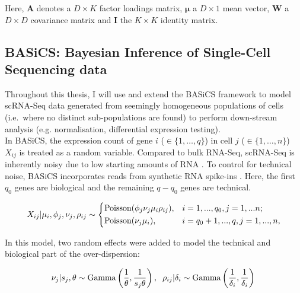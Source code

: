 Here, $\bm{A}$ denotes a $D\times{}K$ factor loadings matrix, $\bm{\mu}$ a $D\times{}1$ mean vector, $\bm{W}$ a $D\times{}D$ covariance matrix and $\bm{I}$ the $K\times{}K$ identity matrix.

\newpage

\subsection{BASiCS: Bayesian Inference of Single-Cell Sequencing data} 
\label{sec0:BASiCS}

Throughout this thesis, I will use and extend the \gls{BASiCS} framework \citep{Vallejos2015BASiCS, Vallejos2016} to model scRNA-Seq data generated from seemingly homogeneous populations of cells (i.e.~where no distinct sub-populations are found) to perform down-stream analysis (e.g. normalisation, differential expression testing).\\

In BASiCS, the expression count of gene $i$ ($ \in \{1, \ldots, q\}$) in cell $j$ ($\in \{ 1, \ldots ,n\}$) $X_{ij}$ is treated as a random variable. Compared to bulk RNA-Seq, scRNA-Seq is inherently noisy due to low starting amounts of RNA \citep{Brennecke2013}. To control for technical noise, BASiCS incorporates reads from synthetic RNA spike-ins \citep{Jiang2011}. Here, the first $q_0$ genes are biological and the  remaining $q-q_0$ genes are technical.

\begin{equation} 
 X_{ij}|\mu_i,\phi_j,\nu_j,\rho_{ij} \sim
 \left\lbrace
  \begin{aligned}
    &\textnormal{Poisson}(\phi_j\nu_j\mu_i\rho_{ij}), && i=1,...,q_0,j=1,...n;  \\ 
    &\textnormal{Poisson}(\nu_j\mu_i), && i=q_0+1,...,q,j=1,...,n,    	    
  \end{aligned}
\right.
\end{equation} 

In this model, two random effects were added to model the technical and biological part of the over-dispersion:

\begin{equation} 
\nu_j|s_j,\theta \sim \textnormal{Gamma}\left(\frac{1}{\theta},\frac{1}{s_j\theta}\right), \hspace{0.2cm} \rho_{ij}|\delta_i  \sim \textnormal{Gamma}\left(\frac{1}{\delta_i},\frac{1}{\delta_i}\right)\\
\end{equation} 

